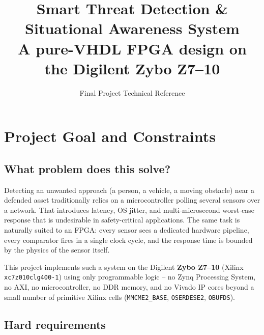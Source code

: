 \documentclass[11pt,a4paper]{article}
\title{
  \vspace{-1cm}
  \textbf{Smart Threat Detection \&\\Situational Awareness System}\\[0.5em]
  \large A pure-VHDL FPGA design on the Digilent Zybo Z7--10
}
\author{Final Project Technical Reference}
\date{}
\begin{document}
\maketitle
\thispagestyle{empty}

\begin{center}
\end{center}

\tableofcontents
\newpage

\section{Project Goal and Constraints}

\subsection{What problem does this solve?}

Detecting an unwanted approach (a person, a vehicle, a moving obstacle)
near a defended asset traditionally relies on a microcontroller polling
several sensors over a network. That introduces latency, OS jitter, and
multi-microsecond worst-case response that is undesirable in
safety-critical applications. The same task is naturally suited to an
FPGA: every sensor sees a dedicated hardware pipeline, every comparator
fires in a single clock cycle, and the response time is bounded by the
physics of the sensor itself.

This project implements such a system on the Digilent
\textbf{Zybo Z7--10} (Xilinx \texttt{xc7z010clg400-1}) using only
programmable logic -- no Zynq Processing System, no AXI, no
microcontroller, no DDR memory, and no Vivado IP cores beyond a small
number of primitive Xilinx cells (\texttt{MMCME2\_BASE},
\texttt{OSERDESE2}, \texttt{OBUFDS}).

\subsection{Hard requirements}
\end{document}
